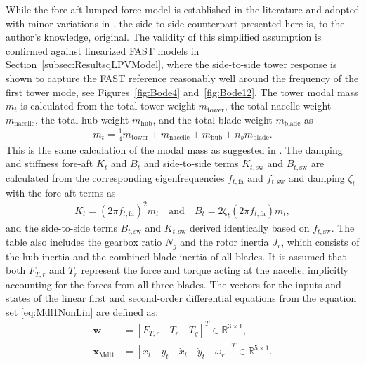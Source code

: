 %
While the fore-aft lumped-force model is established in the literature \cite{Bianchi2007} and adopted with minor variations in \cite{mulders2020preventing}, the side-to-side counterpart presented here is, to the author's knowledge, original. The validity of this simplified assumption is confirmed against linearized FAST models in Section~\ref{subsec:ResultsqLPVModel}, where the side-to-side tower response is shown to capture the FAST reference reasonably well around the frequency of the first tower mode, see Figures~\ref{fig:Bode4} and~\ref{fig:Bode12}. 
%
The tower modal mass \( m_t \) is calculated from the total tower weight \( m_{\text{tower}} \), the total nacelle weight \( m_{\text{nacelle}} \), the total hub weight \( m_{\text{hub}} \), and the total blade weight \( m_{\text{blade}} \) as  
\begin{align} \label{eq:modalMass}
    m_t = \frac{1}{4}m_{\text{tower}} + m_{\text{nacelle}} + m_{\text{hub}} + n_b m_{\text{blade}}.
\end{align} 
This is the same calculation of the modal mass as suggested in \cite{schlipf2013nonlinear}.
The damping and stiffness fore-aft $K_t$ and $B_t$ and side-to-side terms $K_{t,\text{sw}}$ and $B_{t,\text{sw}}$ are calculated from the corresponding eigenfrequencies $f_{t,\text{fa}}$ and  $f_{t,\text{sw}}$ and damping $\zeta_t$  with the fore-aft terms as
\begin{align} \label{eq:DampingStiffness}
   K_t = (2\pi f_{t,\text{fa}})^2 m_t\quad\text{and}\quad B_t = 2 \zeta_t (2\pi f_{t,\text{fa}}) m_t,
\end{align}
and the side-to-side terms $B_{t,\text{sw}}$ and $K_{t,\text{sw}}$ derived identically based on $f_{t,\text{sw}}$.
 The table also includes the gearbox ratio $N_g$ and the rotor inertia $J_r$, which consists of the hub inertia and the combined blade inertia of all blades. It is assumed that both $F_{T,r}$ and $T_r$ represent the force and torque acting at the nacelle, implicitly accounting for the forces from all three blades. %
%    
The vectors for the inputs and states of the linear first and second-order differential equations from the equation set \eqref{eq:Mdl1NonLin} are defined as:
\begin{equation}\label{eq:NonLinInputDef}
    \begin{split}
        \bm{w} &= [F_{T,r} \quad T_r \quad T_g ]^T  \in \mathbb{R}^{3 \times 1},\\
        \bm{x}_{\text{Mdl1}} &= [ x_{t} \quad y_{t} \quad \dot{x}_{t} \quad \dot{y}_{t} \quad \omega_r]^T \in \mathbb{R}^{5 \times 1}.
    \end{split}
\end{equation}
